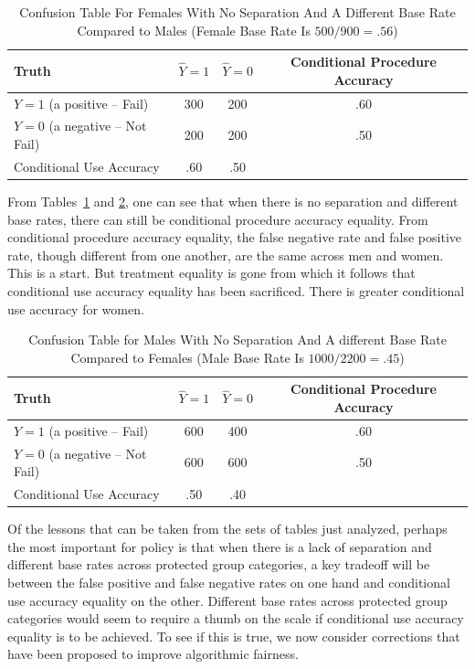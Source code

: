 \documentclass[12pt]{article}
\begin{document}
\begin{table}[htbp]
\footnotesize
\caption{Confusion Table For Females With No Separation And A Different Base Rate Compared to Males (Female Base Rate Is $500/900=.56$)}
\begin{center}
\begin{tabular}{|l|c|c|c|}
\hline \hline
Truth & $\hat{Y} = 1$ & $\hat{Y} = 0$ & Conditional Procedure Accuracy  \\
\hline
$ Y=1$ (a positive -- Fail) & 300 & 200  & .60 \\
\hline
$Y = 0$  (a negative -- Not Fail)& 200 & 200  & .50 \\
\hline
Conditional Use Accuracy & .60 & .50 & \\
\hline
\hline
\end{tabular}
\end{center}
\label{tab:NoSepF}
\end{table}

From Tables~\ref{tab:NoSepF} and \ref{tab:NoSepM}, one can see that when there is no separation and different base rates, there can still be conditional procedure accuracy equality. From conditional procedure accuracy equality, the false negative rate and false positive rate, though different from one another, are the same across men and women. This is a start. But treatment equality is gone from which it follows that conditional use accuracy equality has been sacrificed. There is greater conditional use accuracy for women. 


\begin{table}[htbp]
\footnotesize
\caption{Confusion Table for Males With No Separation And A different Base Rate Compared to Females (Male Base Rate Is $1000/2200=.45$)}
\begin{center}
\begin{tabular}{|l|c|c|c|}
\hline \hline
Truth & $\hat{Y} = 1$ & $\hat{Y} = 0$ & Conditional Procedure Accuracy  \\
\hline
$ Y=1$ (a positive -- Fail) & 600 & 400  & .60 \\
\hline
$Y = 0$  (a negative -- Not Fail) & 600 & 600  & .50 \\
\hline
Conditional Use Accuracy & .50 & .40 & \\
\hline
\hline
\end{tabular}
\end{center}
\label{tab:NoSepM}
\end{table}

Of the lessons that can be taken from the sets of tables just analyzed, perhaps the most important for policy is that when there is a lack of separation and different base rates across protected group categories, a key tradeoff will be between the false positive and false negative rates on one hand and conditional use accuracy equality on the other. Different base rates across protected group categories would seem to require a thumb on the scale if conditional use accuracy equality is to be achieved. To see if this is true, we now consider corrections that have been proposed to improve algorithmic fairness.
 
\end{document}
